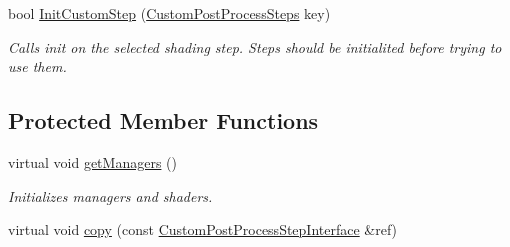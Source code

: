 \begin{DoxyCompactItemize}
\mbox{\label{class_geometry_engine_1_1_custom_shading_1_1_custom_post_process_step_interface_ac1f4d438c1829e7dbf02c70f1bcaa9c4}} 
bool \mbox{\hyperlink{class_geometry_engine_1_1_custom_shading_1_1_custom_post_process_step_interface_ac1f4d438c1829e7dbf02c70f1bcaa9c4}{Init\+Custom\+Step}} (\mbox{\hyperlink{namespace_geometry_engine_1_1_custom_shading_a09e44ca81de5fe08c6d50271d680c4b1}{Custom\+Post\+Process\+Steps}} key)
\begin{DoxyCompactList}\small\item\em Calls init on the selected shading step. Steps should be initialited before trying to use them. \end{DoxyCompactList}\end{DoxyCompactItemize}
\subsection*{Protected Member Functions}
\begin{DoxyCompactItemize}
\item 
\mbox{\label{class_geometry_engine_1_1_custom_shading_1_1_custom_post_process_step_interface_a1e61dab1e0582bc758c383d3014fc3d2}} 
virtual void \mbox{\hyperlink{class_geometry_engine_1_1_custom_shading_1_1_custom_post_process_step_interface_a1e61dab1e0582bc758c383d3014fc3d2}{get\+Managers}} ()
\begin{DoxyCompactList}\small\item\em Initializes managers and shaders. \end{DoxyCompactList}\item 
virtual void \mbox{\hyperlink{class_geometry_engine_1_1_custom_shading_1_1_custom_post_process_step_interface_a9ae01d12255b61cdeb0a1b2e6d9cf785}{copy}} (const \mbox{\hyperlink{class_geometry_engine_1_1_custom_shading_1_1_custom_post_process_step_interface}{Custom\+Post\+Process\+Step\+Interface}} \&ref)
\end{DoxyCompactItemize}
